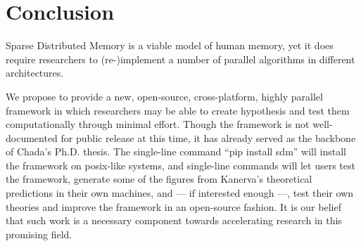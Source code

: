 \chapter{Conclusion}
Sparse Distributed Memory is a viable model of human memory, yet it does require researchers to (re-)implement a number of parallel algorithms in different architectures.  

We propose to provide a new, open-source, cross-platform, highly parallel framework in which researchers may be able to create hypothesis and test them computationally through minimal effort. Though the framework is not well-documented for public release at this time, it has already served as the backbone of Chada's Ph.D. thesis. The single-line command ``pip install sdm'' will install the framework on posix-like systems, and single-line commands will let users test the framework, generate some of the figures from Kanerva's theoretical predictions in their own machines, and --- if interested enough ---, test their own theories and improve the framework in an open-source fashion. It is our belief that such work is a necessary component towards accelerating research in this promising field.


